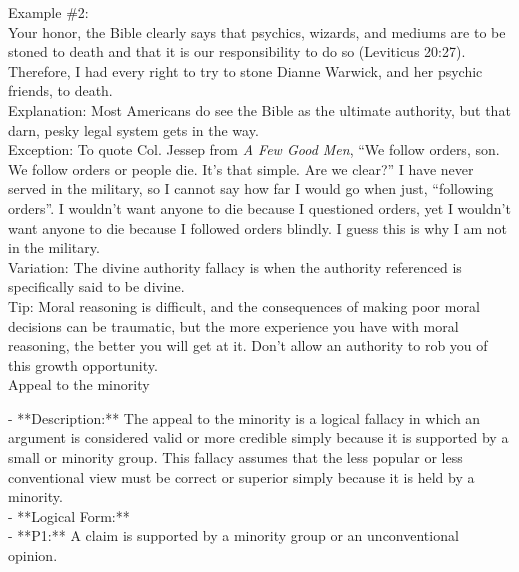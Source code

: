 \documentclass[a4paper,12pt,single,pdftex]{scrartcl}
\begin{document}
    
      Example \#2:
    \\

    
      Your honor, the Bible clearly says that psychics, wizards, and mediums are to be stoned to death and that it is our responsibility to do so (Leviticus 20:27).  Therefore, I had every right to try to stone Dianne Warwick, and her psychic friends, to death.
    \\

    
      Explanation: Most Americans do see the Bible as the ultimate authority, but that darn, pesky legal system gets in the way.
    \\

    
      Exception: To quote Col. Jessep from {\it A Few Good Men}, “We follow orders, son. We follow orders or people die. It's that simple. Are we clear?”  I have never served in the military, so I cannot say how far I would go when just, “following orders”.  I wouldn’t want anyone to die because I questioned orders, yet I wouldn’t want anyone to die because I followed orders blindly.  I guess this is why I am not in the military.
    \\

    
      Variation: The divine authority fallacy is when the authority referenced is specifically said to be divine.
    \\

    
      Tip: Moral reasoning is difficult, and the consequences of making poor moral decisions can be traumatic, but the more experience you have with moral reasoning, the better you will get at it. Don’t allow an authority to rob you of this growth opportunity.
    \\

  

Appeal to the minority
    
      - **Description:** The appeal to the minority is a logical fallacy in which an argument is considered valid or more credible simply because it is supported by a small or minority group. This fallacy assumes that the less popular or less conventional view must be correct or superior simply because it is held by a minority.
    \\

    
      - **Logical Form:**
    \\

    
        - **P1:** A claim is supported by a minority group or an unconventional opinion.
    \\
\end{document}
